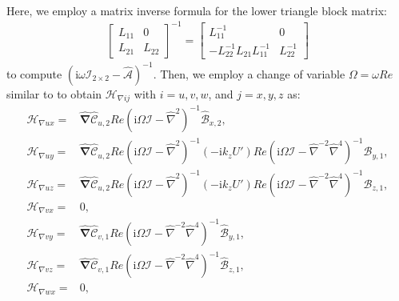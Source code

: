 \begin{myproof}
\begin{subequations}
\begin{align}
\end{align}
\end{subequations}
Here, we employ a matrix inverse formula for the lower triangle block matrix:
\begin{align}
        \begin{bmatrix}
    L_{11} & 0 \\
    L_{21} & L_{22}
    \end{bmatrix}^{-1}=\begin{bmatrix}
    L_{11}^{-1} & 0\\
    -L_{22}^{-1}L_{21}L_{11}^{-1} & L_{22}^{-1} 
    \end{bmatrix}
\end{align}
to compute $\left(\text{i}\omega\mathcal{I}_{2\times 2}-\widehat{\mathcal{A}}\right)^{-1}$. Then, we employ a change of variable $\Omega=\omega Re$ similar to \citep{jovanovic2004modeling,Jovanovic2005,jovanovic2020bypass} to obtain $\mathcal{H}_{\nabla ij}$ with $i=u,v,w$, and $j=x,y,z$ as:
\begingroup
\allowdisplaybreaks
\begin{subequations}
\begin{align}
    \mathcal{H}_{\nabla ux}=&\widehat{\boldsymbol{\nabla}}\widehat{\mathcal{C}}_{u,2}Re\left(\text{i}\Omega \mathcal{I}-\widehat{{\nabla}}^2\right)^{-1}\widehat{\mathcal{B}}_{x,2},\\
    \mathcal{H}_{\nabla uy}=&\widehat{\boldsymbol{\nabla}}\widehat{\mathcal{C}}_{u,2}Re\left(\text{i}\Omega \mathcal{I}-\widehat{{\nabla}}^2\right)^{-1}(-\text{i}k_zU')Re\left(\text{i}\Omega \mathcal{I}-\widehat{{\nabla}}^{-2}\widehat{{\nabla}}^{4}\right)^{-1} \widehat{\mathcal{B}}_{y,1},\\
    \mathcal{H}_{\nabla uz}=&\widehat{\boldsymbol{\nabla}}\widehat{\mathcal{C}}_{u,2}Re\left(\text{i}\Omega \mathcal{I}-\widehat{{\nabla}}^2\right)^{-1}(-\text{i}k_zU')Re\left(\text{i}\Omega \mathcal{I}-\widehat{{\nabla}}^{-2}\widehat{{\nabla}}^{4}\right)^{-1} \widehat{\mathcal{B}}_{z,1},\\
    \mathcal{H}_{\nabla vx}=&0,\\
    \mathcal{H}_{\nabla vy}=&\widehat{\boldsymbol{\nabla}}\widehat{\mathcal{C}}_{v,1}Re\left(\text{i}\Omega \mathcal{I}-\widehat{{\nabla}}^{-2}\widehat{{\nabla}}^{4}\right)^{-1} \widehat{\mathcal{B}}_{y,1},\\
    \mathcal{H}_{\nabla vz}=&\widehat{\boldsymbol{\nabla}}\widehat{\mathcal{C}}_{v,1}Re\left(\text{i}\Omega \mathcal{I}-\widehat{{\nabla}}^{-2}\widehat{{\nabla}}^{4}\right)^{-1} \widehat{\mathcal{B}}_{z,1},\\ \mathcal{H}_{\nabla wx}=&0,\\

\end{align}
\end{subequations}
\end{myproof}
